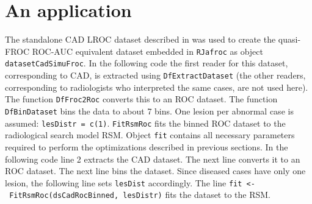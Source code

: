\documentclass[
]{book}
\newenvironment{Shaded}{\begin{snugshade}}{\end{snugshade}}
\newcommand{\CharTok}[1]{\textcolor[rgb]{0.31,0.60,0.02}{#1}}
\newcommand{\CommentTok}[1]{\textcolor[rgb]{0.56,0.35,0.01}{\textit{#1}}}
\newcommand{\DataTypeTok}[1]{\textcolor[rgb]{0.13,0.29,0.53}{#1}}
\newcommand{\DecValTok}[1]{\textcolor[rgb]{0.00,0.00,0.81}{#1}}
\newcommand{\KeywordTok}[1]{\textcolor[rgb]{0.13,0.29,0.53}{\textbf{#1}}}
\newcommand{\NormalTok}[1]{#1}
\newcommand{\OperatorTok}[1]{\textcolor[rgb]{0.81,0.36,0.00}{\textbf{#1}}}
\newcommand{\StringTok}[1]{\textcolor[rgb]{0.31,0.60,0.02}{#1}}
\begin{document}
\hypertarget{optim-op-point-application}{%
\section{An application}\label{optim-op-point-application}}

The standalone CAD LROC dataset described in \citep{hupse2013standalone} was used to create the quasi-FROC ROC-AUC equivalent dataset embedded in \texttt{RJafroc} as object \texttt{datasetCadSimuFroc}. In the following code the first reader for this dataset, corresponding to CAD, is extracted using \texttt{DfExtractDataset} (the other readers, corresponding to radiologists who interpreted the same cases, are not used here). The function \texttt{DfFroc2Roc} converts this to an ROC dataset. The function \texttt{DfBinDataset} bins the data to about 7 bins. One lesion per abnormal case is assumed: \texttt{lesDistr\ =\ c(1)}. \texttt{FitRsmRoc} fits the binned ROC dataset to the radiological search model RSM. Object \texttt{fit} contains all necessary parameters required to perform the optimizations described in previous sections. In the following code line 2 extracts the CAD dataset. The next line converts it to an ROC dataset. The next line bins the dataset. Since diseased cases have only one lesion, the following line sets \texttt{lesDist} accordingly. The line \texttt{fit\ \textless{}-\ FitRsmRoc(dsCadRocBinned,\ lesDistr)} fits the dataset to the RSM.

\begin{Shaded}
\end{Shaded}
\end{document}
